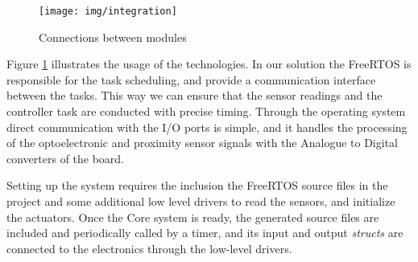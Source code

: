 \begin{figure}[H]
    \centering
    \texttt{[image: img/integration]}
    \caption{Connections between modules}
    \label{fig:integration}
\end{figure}

Figure \ref{fig:integration} illustrates the usage of the technologies. In our solution the \textsf{FreeRTOS} is responsible for the task scheduling, and provide a communication interface between the tasks. This way we can ensure that the sensor readings and the controller task are conducted with precise timing. Through the operating system direct communication with the \textsf{I/O} ports is simple, and it handles the processing of the optoelectronic and proximity sensor signals with the Analogue to Digital converters of the board.

Setting up the system requires the inclusion the \textsf{FreeRTOS} source files in the project and some additional low level drivers to read the sensors, and initialize the actuators. Once the Core system is ready, the generated source files are included and periodically called by a timer, and its input and output \emph{structs} are connected to the electronics through the low-level drivers.
